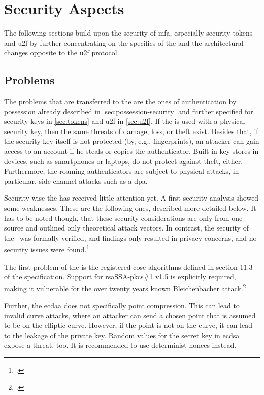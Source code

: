 \section{Security Aspects}

The following sections build upon the security of \gls{mfa}, especially security tokens and \gls{u2f} by further concentrating on the specifics of the \wa{} and the architectural changes opposite to the \gls{u2f} protocol.

\subsection{Problems}

The problems that are transferred to the \wa{} are the ones of authentication by possession already described in \autoref{sec:possession-security} and further specified for security keys in \autoref{sec:tokens} and \gls{u2f} in \autoref{sec:u2f}. If the \wa{} is used with a physical security key, then the same threats of damage, loss, or theft exist. Besides that, if the security key itself is not protected (by, e.g., fingerprints), an attacker can gain access to an account if he steals or copies the authenticator. Built-in key stores in devices, such as smartphones or laptops, do not protect against theft, either. Furthermore, the roaming authenticators are subject to physical attacks, in particular, side-channel attacks such as a \gls{dpa}.

Security-wise the \wa{} has received little attention yet. A first security analysis showed some weaknesses. These are the following ones, described more detailed below. It has to be noted though, that these security considerations are only from one source and outlined only theoretical attack vectors. In contrast, the security of the \wa{} was formally verified, and findings only resulted in privacy concerns, and no security issues were found.\footcites[See][]{paragon-webauth}[See][9]{FormalVerificationWebAuthn}

The first problem of the \wa{} is the registered \gls{cose} algorithms defined in section 11.3 of the specification. Support for \gls{rsa}SSA-\gls{pkcs}\#1 v1.5 is explicitly required, making it vulnerable for the over twenty years known \frqq Bleichenbacher attack\flqq.\footcites[See][]{10.1007/BFb0055716}[See][Chapter 11.3]{w3c}

Further, the \gls{ecdaa} does not specifically point compression. This can lead to invalid curve attacks, where an attacker can send a chosen point that is assumed to be on the elliptic curve. However, if the point is not on the curve, it can lead to the leakage of the private key. Random values for the secret key in \gls{ecdsa} expose a threat, too. It is recommended to use determinist \glspl{nonce} instead.

